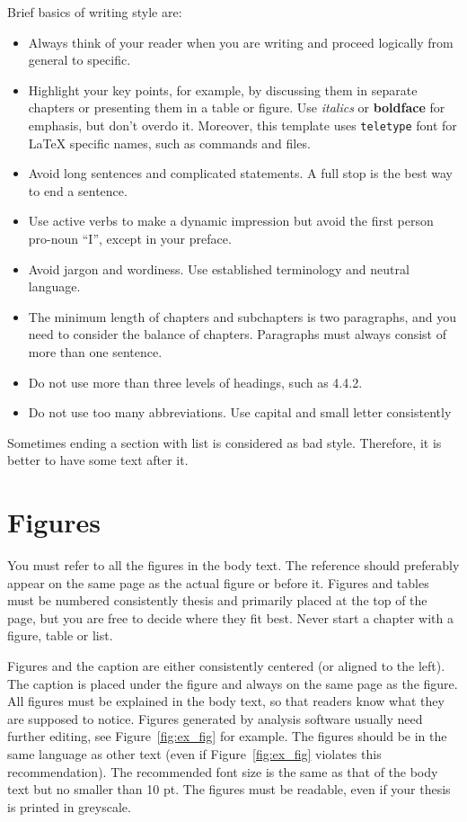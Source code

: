 \documentclass[12pt,a4paper,finnish]{tutthesis}
\begin{document}
Brief basics of writing style are:
\begin{itemize}
\item Always think of your reader when you are writing and proceed
  logically from general to specific.
\item Highlight your key points, for example, by discussing them in
  separate chapters or presenting them in a table or figure. Use
  \textit{italics} or \textbf{boldface} for emphasis, but don't overdo
  it.  Moreover, this template uses \texttt{teletype} font for LaTeX
  specific names, such as commands and files.
\item Avoid long sentences and complicated statements. A full stop is
  the best way to end a sentence.
\item Use active verbs to make a dynamic impression but avoid the
  first person pro-noun ``I'', except in your preface.
\item Avoid jargon and wordiness. Use established terminology and
  neutral language.
\item The minimum length of chapters and subchapters is two
  paragraphs, and you need to consider the balance of
  chapters. Paragraphs must always consist of more than one sentence.
\item Do not use more than three levels of headings, such as 4.4.2.
\item Do not use too many abbreviations. Use capital and small letter
  consistently
\end{itemize}

Sometimes ending a section with list is considered as bad
style. Therefore, it is better to have some text after it.


\section{Figures}
You must refer to all the figures in the body text. The reference
should preferably appear on the same page as the actual figure or
before it. Figures and tables must be numbered consistently thesis
and primarily placed at the top of the page, but you are free to
decide where they fit best. Never start a chapter with a figure, table
or list.

Figures and the caption are either consistently centered (or aligned
to the left). The caption is placed under the figure and always on the
same page as the figure. All figures must be explained in the body
text, so that readers know what they are supposed to notice. Figures
generated by analysis software usually need further editing, see
Figure~\ref{fig:ex_fig} for example. The figures should be in the same
language as other text (even if Figure~\ref{fig:ex_fig} violates this
recommendation). The recommended font size is the same as that of the
body text but no smaller than 10 pt. The figures must be readable,
even if your thesis is printed in greyscale.
\end{document}
